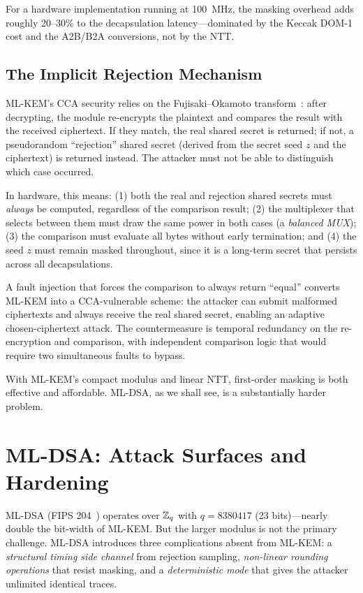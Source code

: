 For a hardware implementation running at 100~MHz, the masking overhead adds roughly 20--30\% to the decapsulation latency---dominated by the Keccak DOM-1 cost and the A2B/B2A conversions, not by the NTT.

\subsection{The Implicit Rejection Mechanism}
\label{subsec:implicit-rejection}

ML-KEM's CCA security relies on the Fujisaki--Okamoto transform~\cite{HofheinzHovemannKiltz2017}: after decrypting, the module re-encrypts the plaintext and compares the result with the received ciphertext.  If they match, the real shared secret is returned; if not, a pseudorandom ``rejection'' shared secret (derived from the secret seed $z$ and the ciphertext) is returned instead.  The attacker must not be able to distinguish which case occurred.

In hardware, this means: (1) both the real and rejection shared secrets must \emph{always} be computed, regardless of the comparison result; (2) the multiplexer that selects between them must draw the same power in both cases (a \emph{balanced MUX}); (3) the comparison must evaluate all bytes without early termination; and (4) the seed $z$ must remain masked throughout, since it is a long-term secret that persists across all decapsulations.

A fault injection that forces the comparison to always return ``equal'' converts ML-KEM into a CCA-vulnerable scheme: the attacker can submit malformed ciphertexts and always receive the real shared secret, enabling an adaptive chosen-ciphertext attack.  The countermeasure is temporal redundancy on the re-encryption and comparison, with independent comparison logic that would require two simultaneous faults to bypass.

With ML-KEM's compact modulus and linear NTT, first-order masking is both effective and affordable.  ML-DSA, as we shall see, is a substantially harder problem.


\section{ML-DSA: Attack Surfaces and Hardening}
\label{sec:mldsa-hardening}

ML-DSA (FIPS 204~\cite{FIPS204}) operates over $\mathbb{Z}_q$ with $q = 8380417$ (23 bits)---nearly double the bit-width of ML-KEM.  But the larger modulus is not the primary challenge.  ML-DSA introduces three complications absent from ML-KEM: a \emph{structural timing side channel} from rejection sampling, \emph{non-linear rounding operations} that resist masking, and a \emph{deterministic mode} that gives the attacker unlimited identical traces.

